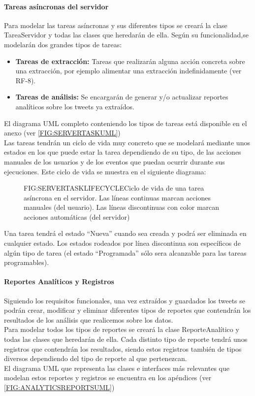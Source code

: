 \paragraph{Tareas asíncronas del servidor}
Para modelar las tareas asíncronas y sus diferentes tipos se creará la clase TareaServidor y todas las clases que heredarán de ella.
Según su funcionalidad,se modelarán dos grandes tipos de tareas:
\begin{itemize}
	\item \textbf{Tareas de extracción:} Tareas que realizarán alguna acción concreta sobre una extracción, por ejemplo alimentar una extracción indefinidamente (ver RF-8).
	\item \textbf{Tareas de análisis:} Se encargarán de generar y/o actualizar reportes analíticos sobre los tweets ya extraídos.
\end{itemize}
El diagrama UML completo conteniendo los tipos de tareas está disponible en el anexo (ver \ref{FIG:SERVERTASKUML}) \\
Las tareas tendrán un ciclo de vida muy concreto que se modelará mediante unos estados en los que puede estar la tarea dependiendo de su tipo, de las acciones manuales de los usuarios y de los eventos que puedan ocurrir durante sus ejecuciones.
Este ciclo de vida se muestra en el siguiente diagrama:

\begin{figure}[Ciclo de vida de una tarea asíncrona]{FIG:SERVERTASKLIFECYCLE}{Ciclo de vida de una tarea asíncrona en el servidor. Las líneas continuas marcan acciones manuales (del usuario). Las líneas discontinuas con color marcan acciones automáticas (del servidor)}
\end{figure}
Una tarea tendrá el estado ``Nueva'' cuando sea creada y podrá ser eliminada en cualquier estado. Los estados rodeados por línea discontinua son específicos de algún tipo de tarea (el estado ``Programada'' sólo sera alcanzable para las tareas programables).
\paragraph{Reportes Analíticos y Registros}
Siguiendo los requisitos funcionales, una vez extraídos y guardados los tweets se podrán crear, modificar y eliminar diferentes tipos de reportes que contendrán los resultados de los análisis que realicemos sobre los datos.\\
Para modelar todos los tipos de reportes se creará la clase ReporteAnalítico y todas las clases que heredarán de ella.
Cada distinto tipo de reporte tendrá unos registros que contendrán los resultados, siendo estos registros también de tipos diversos dependiendo del tipo de reporte al que pertenezcan.\\
El diagrama UML que representa las clases e interfaces más relevantes que modelan estos reportes y registros se encuentra en los apéndices (ver \ref{FIG:ANALYTICSREPORTSUML})
